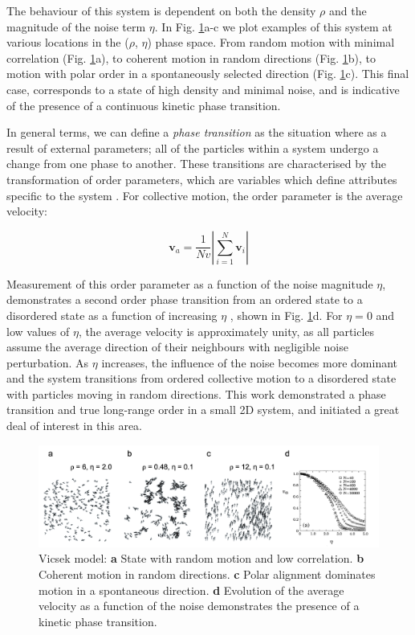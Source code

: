 The behaviour of this system is dependent on both the density $\rho$ and the magnitude of the noise term $\eta$. In Fig. \ref{fig:Vicsek}a-c we plot examples of this system at various locations in the ($\rho$, $\eta$) phase space.  From random motion with minimal correlation (Fig. \ref{fig:Vicsek}a), to coherent motion in random directions (Fig. \ref{fig:Vicsek}b), to motion with polar order in a spontaneously selected direction (Fig. \ref{fig:Vicsek}c). This final case, corresponds to a state of high density and minimal noise, and is indicative of the presence of a continuous kinetic phase transition.

In general terms, we can define a \textit{phase transition} as the situation where as a result of external parameters; all of the particles within a system undergo a change from one phase to another. These transitions are characterised by the transformation of order parameters, which are variables which define attributes specific to the system \cite{vicsek2012}. For collective motion, the order parameter is the average velocity:


\begin{equation}
	\boldsymbol{v}_{a}=\frac{1}{N v}\left|\sum_{i=1}^{N} \mathbf{v}_{i}\right|
\end{equation}


\noindent Measurement of this order parameter as a function of the noise magnitude $\eta$, demonstrates a second order phase transition from an ordered state to a disordered state as a function of increasing $\eta$ \cite{vicsek1995}, shown in Fig. \ref{fig:Vicsek}d. For $\eta=0$ and low values of $\eta$, the average velocity is approximately unity, as all particles assume the average direction of their neighbours with negligible noise perturbation. As $\eta$ increases, the influence of the noise becomes more dominant and the system transitions from ordered collective motion to a disordered state with particles moving in random directions. This work demonstrated a phase transition and true long-range order in a small 2D system, and initiated a great deal of interest in this area.

\begin{figure}
	\includegraphics[width=\linewidth]{chapters/activeMatter/figsActiveMatter/figVicsek}
	\caption[Vicsek model]{Vicsek model: \textbf{a} State with random motion and low correlation. \textbf{b} Coherent motion in random directions. \textbf{c} Polar alignment dominates motion in a spontaneous direction. \textbf{d} Evolution of the average velocity as a function of the noise demonstrates the presence of a kinetic phase transition.}
	\label{fig:Vicsek}
\end{figure}



